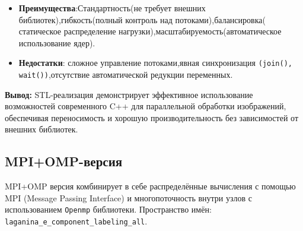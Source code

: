 \documentclass[12pt]{extarticle}
\begin{document}
\begin{itemize}
      управление потоками.
     \begin{lstlisting}[caption={Динамическое управление потоками},label={all11}]
     int num_threads = std::min(ppc::util::GetPPCNumThreads(),
                         static_cast<int>(std::thread::hardware_concurrency()));
     \end{lstlisting}
      разделение данных.
      \begin{lstlisting}[caption={Статическое разделение данных},label={all12}]
      const int chunk_size = (size + num_threads - 1) / num_threads;
      \end{lstlisting}
       задачи.
      \begin{lstlisting}[caption={Асинхронные задачи},label={all13}]
      auto future = std::async(std::launch::async, [&] { /* task*/ });
      \end{lstlisting}
    \item \textbf{Преимущества}:Стандартность(не требует внешних библиотек),гибкость(полный контроль над потоками),балансировка( статическое распределение нагрузки),масштабируемость(автоматическое использование ядер).
    \item \textbf{Недостатки}: сложное управление потоками,явная синхронизация \texttt{(join(), wait())},отсутствие автоматической редукции переменных.
\end{itemize}

\textbf{Вывод:} STL-реализация демонстрирует эффективное использование возможностей современного C++ для параллельной обработки изображений, обеспечивая переносимость и хорошую производительность без зависимостей от внешних библиотек.

\subsection{MPI+OMP-версия}

\hspace*{1.25cm}MPI+OMP версия комбинирует в себе распределённые вычисления с помощью MPI (Message Passing Interface) и многопоточность внутри узлов с использованием \texttt{Openmp} библиотеки. Пространство имён: \texttt{laganina\_e\_component\_labeling\_all}. \\[-0.1cm]
\end{document}
